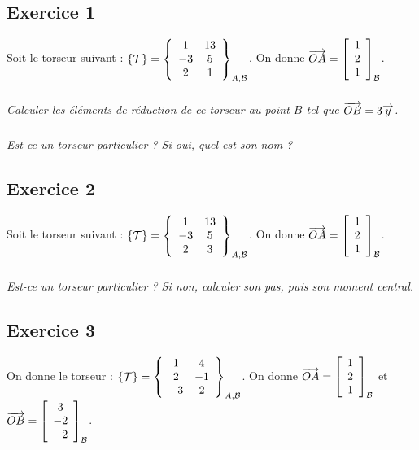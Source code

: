 \documentclass[10pt,oneside]{article}
\begin{document}
\subsection*{Exercice 1}
\setcounter{subparagraph}{0}
Soit le torseur suivant :
$\torseur{\mathcal{T}} = \torseurcol{1}{-3}{2}{13}{5}{1}{A,\mathcal{B}}$. On donne $\vect{OA}=\left[\begin{array}{c} 1 \\ 2 \\ 1\end{array}\right]_{\mathcal{B}}$.

\subparagraph{}
\textit{Calculer les éléments de réduction de ce torseur au point $B$ tel que $\vect{OB}=3\vect{y}$.}

\subparagraph{}
\textit{Est-ce un torseur particulier ? Si oui, quel est son nom ?}

\subsection*{Exercice 2}
\setcounter{subparagraph}{0}
Soit le torseur suivant :
$\torseur{\mathcal{T}} = \torseurcol{1}{-3}{2}{13}{5}{3}{A,\mathcal{B}}$. On donne $\vect{OA}=\left[\begin{array}{c} 1 \\ 2 \\ 1\end{array}\right]_{\mathcal{B}}$.

\subparagraph{}
\textit{Est-ce un torseur particulier ? Si non, calculer son pas, puis son moment central.}

\subsection*{Exercice 3}
\setcounter{subparagraph}{0}
On donne le torseur :
$\torseur{\mathcal{T}} = \torseurcol{1}{2}{-3}{4}{-1}{2}{A,\mathcal{B}}$. On donne $\vect{OA}=\left[\begin{array}{c} 1 \\ 2 \\ 1\end{array}\right]_{\mathcal{B}}$ et 
$\vect{OB}=\left[\begin{array}{c} 3 \\ -2 \\ -2\end{array}\right]_{\mathcal{B}}$.
\end{document}
